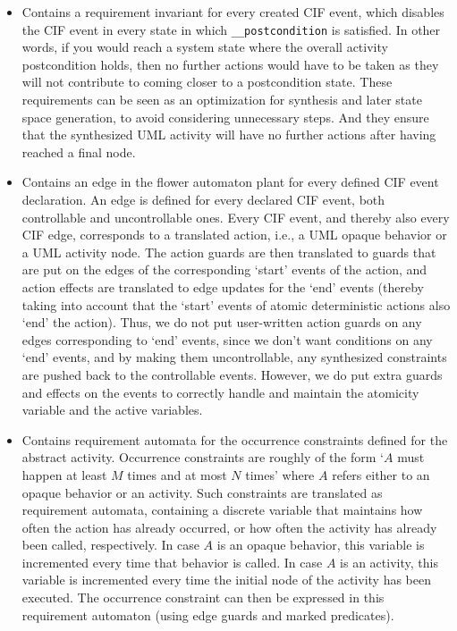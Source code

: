 \documentclass{article}
\theoremstyle{definition}
\begin{document}
\begin{itemize}
	\item Contains a requirement invariant for every created CIF event, which disables the CIF event in every state in which \texttt{\_\_postcondition} is satisfied.
	In other words, if you would reach a system state where the overall activity postcondition holds, then no further actions would have to be taken as they will not contribute to coming closer to a postcondition state.
	These requirements can be seen as an optimization for synthesis and later state space generation, to avoid considering unnecessary steps.
	And they ensure that the synthesized UML activity will have no further actions after having reached a final node.
	\item Contains an edge in the flower automaton plant for every defined CIF event declaration.
	An edge is defined for every declared CIF event, both controllable and uncontrollable ones.
	Every CIF event, and thereby also every CIF edge, corresponds to a translated action, i.e., a UML opaque behavior or a UML activity node.
	The action guards are then translated to guards that are put on the edges of the corresponding `start' events of the action, and action effects are translated to edge updates for the `end' events (thereby taking into account that the `start' events of atomic deterministic actions also `end' the action).
	Thus, we do not put user-written action guards on any edges corresponding to `end' events, since we don't want conditions on any `end' events, and by making them uncontrollable, any synthesized constraints are pushed back to the controllable events.
	However, we do put extra guards and effects on the events to correctly handle and maintain the atomicity variable and the active variables.

	\item Contains requirement automata for the occurrence constraints defined for the abstract activity.
	Occurrence constraints are roughly of the form `$A$ must happen at least $M$ times and at most $N$ times' where $A$ refers either to an opaque behavior or an activity.
	Such constraints are translated as requirement automata, containing a discrete variable that maintains how often the action has already occurred, or how often the activity has already been called, respectively.
	In case $A$ is an opaque behavior, this variable is incremented every time that behavior is called.
	In case $A$ is an activity, this variable is incremented every time the initial node of the activity has been executed.
	The occurrence constraint can then be expressed in this requirement automaton (using edge guards and marked predicates).
\end{itemize}
\end{document}
